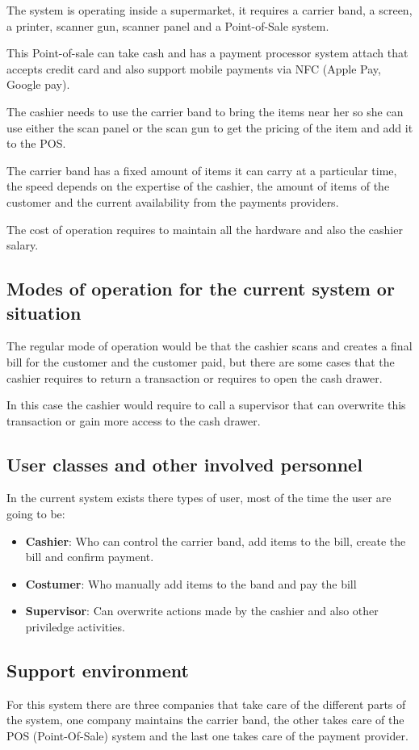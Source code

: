 The system is operating inside a supermarket, it requires a carrier band, a 
screen, a printer, scanner gun, scanner panel and a 
Point-of-Sale system.\newline

\noindent
This Point-of-sale can take cash and has a payment processor system 
attach that accepts credit card and also support mobile payments via 
NFC (Apple Pay, Google pay).\newline

\noindent 
The cashier needs to use the carrier band to bring the items near her so she 
can use either the scan panel or the scan gun to get the pricing of the item 
and add it to the POS.\newline

\noindent 
The carrier band has a fixed amount of items it can carry at a particular time, 
the speed depends on the expertise of the cashier, the amount of items of the 
customer and the current availability from the payments providers.\newline

\noindent 
The cost of operation requires to maintain all the hardware and also the 
cashier salary.

\subsection{Modes of operation for the current system or situation}

The regular mode of operation would be that the cashier scans and creates a 
final bill for the customer and the customer paid, but there are some 
cases that the cashier requires to return a transaction or requires to open 
the cash drawer. \newline

\noindent 
In this case the cashier would require to call a supervisor that can overwrite 
this transaction or gain more access to the cash drawer. \newline

\pagebreak

\subsection{User classes and other involved personnel}
In the current system exists there types of user, most of the time the user 
are going to be:

\begin{itemize}
	\item \textbf{Cashier}: Who can control the carrier band, add items to the 
    bill, create the bill and confirm payment.
	\item \textbf{Costumer}: Who manually add items to the band 
	and pay the bill
	\item \textbf{Supervisor}: Can overwrite actions made by the cashier 
	and also other priviledge activities.
\end{itemize}

\subsection{Support environment}

\noindent 
For this system there are three companies that take care of the different 
parts of the system, one company maintains the carrier band, the other takes 
care of the POS (Point-Of-Sale) system and the last one takes care of 
the payment provider.